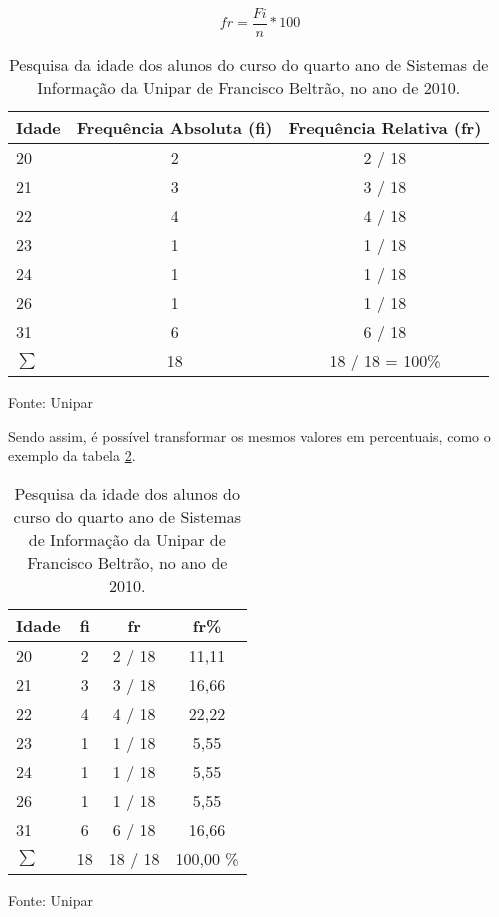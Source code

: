 \documentclass[12pt]{article}
\newcommand{\code}[1] {\textbf{#1}}
\begin{document}
\begin{equation}
\label{fr}
fr = \frac{Fi}{n} * 100
\end{equation} 

\begin{table}
\caption{Pesquisa da idade dos alunos do curso do quarto ano de Sistemas de Informação da Unipar de Francisco Beltrão, no ano de 2010.}
\label{tabela FR}
\begin{tabular}{|l|c|c|} 
\hline 
Idade & Frequência Absoluta (\code{fi}) & Frequência Relativa (\code{fr}) \\ \hline 
20    &               2                   &              2 / 18 \\ 
21    &               3                   &              3 / 18 \\
22    &               4                   &              4 / 18 \\
23    &               1                   &              1 / 18 \\
24    &               1                   &              1 / 18 \\
26    &               1                   &              1 / 18 \\
31    &               6                   &              6 / 18 \\ 
\hline 
\begin{math}
\sum 
\end{math} & 18 & 18 / 18 = 100\% \\
\hline 
\end{tabular}
\small{Fonte: Unipar}
\end{table}

Sendo assim, é possível transformar os mesmos valores em percentuais, como o exemplo da tabela \ref{tabela FR percentual}.

\begin{table}
\caption{Pesquisa da idade dos alunos do curso do quarto ano de Sistemas de Informação da Unipar de Francisco Beltrão, no ano de 2010.}
\label{tabela FR percentual}
\begin{tabular}{|l|c|c|c|} 
\hline 

Idade &  \code{fi} & \code{fr}  & \code{fr\%} \\ \hline 
20    &      2       &      2 / 18  &   11,11  \\ 
21    &      3       &      3 / 18  &   16,66  \\
22    &      4       &      4 / 18  &   22,22  \\
23    &      1       &      1 / 18  &    5,55  \\
24    &      1       &      1 / 18  &    5,55  \\
26    &      1       &      1 / 18  &    5,55  \\
31    &      6       &      6 / 18  &   16,66  \\ 
\hline 
\begin{math}
\sum 
\end{math} & 18      &     18 / 18  & 100,00 \% \\
\hline 
\end{tabular}
\small{Fonte: Unipar}
\end{table}
\end{document}
